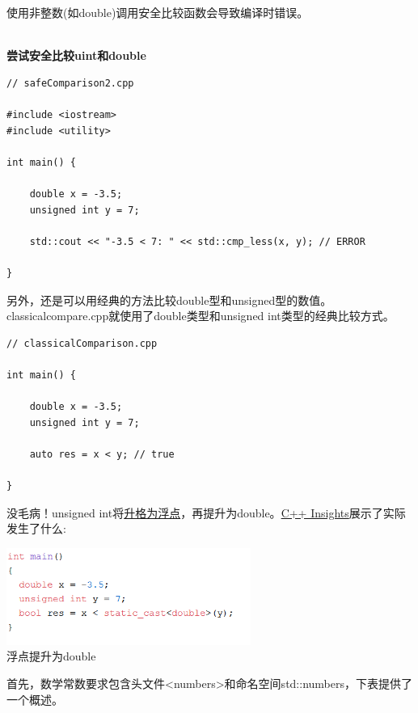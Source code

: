 使用非整数(如double)调用安全比较函数会导致编译时错误。

\hspace*{\fill} \\ %
\noindent
\textbf{尝试安全比较uint和double}
\begin{lstlisting}[style=styleCXX]
// safeComparison2.cpp

#include <iostream>
#include <utility>

int main() {
	
	double x = -3.5;
	unsigned int y = 7;
	
	std::cout << "-3.5 < 7: " << std::cmp_less(x, y); // ERROR
	
}
\end{lstlisting}

另外，还是可以用经典的方法比较double型和unsigned型的数值。classicalcompare.cpp就使用了double类型和unsigned int类型的经典比较方式。

\begin{lstlisting}[style=styleCXX]
// classicalComparison.cpp

int main() {
	
	double x = -3.5;
	unsigned int y = 7;
	
	auto res = x < y; // true
	
}
\end{lstlisting}

没毛病！unsigned int将\href{https://en.cppreference.com/w/cpp/language/implicit_conversion}{升格为浮点}，再提升为double。\href{https://cppinsights.io/s/44216566}{C++ Insights}展示了实际发生了什么:

\begin{center}
\includegraphics[width=0.6\textwidth]{content/3/chapter5/images/1-5.png}\\
浮点提升为double
\end{center}


首先，数学常数要求包含头文件<numbers>和命名空间std::numbers，下表提供了一个概述。


